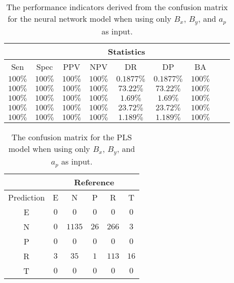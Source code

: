 \begin{table}[!ht]
	\centering
	\begin{tabular}{|c|c|c|c|c|c|c|c|c|}
		\hline
		 & \multicolumn{7}{c|}{Statistics} \\ \hline
		Sen & Spec & PPV & NPV & DR & DP & BA \\ \hline
		$100\%$ & $100\%$ & $100\%$ & $100\%$ & $0.1877\%$ & $0.1877\%$ & $100\%$ \\ \hline
		$100\%$ & $100\%$ & $100\%$ & $100\%$ & $73.22\%$ & $73.22\%$ & $100\%$ \\ \hline
		$100\%$ & $100\%$ & $100\%$ & $100\%$ & $1.69\%$ & $1.69\%$ & $100\%$ \\ \hline
		$100\%$ & $100\%$ & $100\%$ & $100\%$ & $23.72\%$ & $23.72\%$ & $100\%$ \\ \hline
		$100\%$ & $100\%$ & $100\%$ & $100\%$ & $1.189\%$ & $1.189\%$ & $100\%$ \\ \hline
	\end{tabular}
	\caption{The performance indicators derived from the confusion matrix for the neural network model when using only $B_{x}$, $B_{y}$, and $a_{p}$ as input.}
	\label{tab:cs:xyap:nnet}
\end{table}

\begin{table}[!ht]
	\centering
	\begin{tabular}{|c|c|c|c|c|c|}
		\hline
		 & \multicolumn{5}{|c|}{Reference} \\ \hline
		 Prediction & E & N & P & R & T \\ \hline
		 E & $0$ & $0$ & $0$ & $0$ & $0$ \\ \hline
		 N & $0$ & $1135$ & $26$ & $266$ & $3$ \\ \hline
		 P & $0$ & $0$ & $0$ & $0$ & $0$ \\ \hline
		 R & $3$ & $35$ & $1$ & $113$ & $16$ \\ \hline
		 T & $0$ & $0$ & $0$ & $0$ & $0$ \\ \hline
	\end{tabular}
	\caption{The confusion matrix for the PLS model when using only $B_{x}$, $B_{y}$, and $a_{p}$ as input.}
	\label{tab:cm:xyap:pls}
\end{table}

